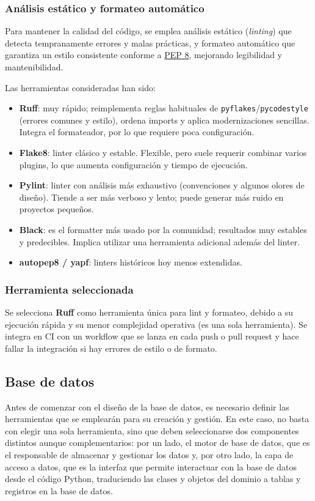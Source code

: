 \subsubsection{Análisis estático y formateo automático}
Para mantener la calidad del código, se emplea análisis estático (\emph{linting}) que detecta tempranamente 
errores y malas prácticas, y formateo automático que garantiza un estilo consistente conforme a 
\href{https://peps.python.org/pep-0008/}{PEP 8}, mejorando legibilidad y mantenibilidad.

Las herramientas consideradas han sido:

\begin{itemize}
  \item \textbf{Ruff}: muy rápido; reimplementa reglas habituales de \texttt{pyflakes}/\texttt{pycodestyle}
  (errores comunes y estilo), ordena imports y aplica modernizaciones sencillas. Integra el formateador, por
  lo que requiere poca configuración.
  \item \textbf{Flake8}: linter clásico y estable. Flexible, pero suele requerir combinar
  varios plugins, lo que aumenta configuración y tiempo de ejecución.
  \item \textbf{Pylint}: linter con análisis más exhaustivo (convenciones y algunos olores de diseño). Tiende
  a ser más verboso y lento; puede generar más ruido en proyectos pequeños.
  \item \textbf{Black}: es el formatter más usado por la comunidad; resultados muy estables y predecibles. Implica
  utilizar una herramienta adicional además del linter.
  \item \textbf{autopep8 / yapf}: linters históricos hoy menos extendidas.
\end{itemize}

\subsubsection{Herramienta seleccionada}
Se selecciona \textbf{Ruff} como herramienta única para lint y formateo, debido a su ejecución rápida y su menor 
complejidad operativa (es una sola herramienta).
Se integra en CI con un workflow que se lanza en cada push o pull request y hace fallar la integración si hay 
errores de estilo o de formato.

\subsection{Base de datos}\label{sec:base-datos}
Antes de comenzar con el diseño de la base de datos, es necesario definir las herramientas que se emplearán para 
su creación y gestión. En este caso, no basta con elegir una sola herramienta, sino que deben seleccionarse dos 
componentes distintos aunque complementarios: por un lado, el motor de base de datos, que es el responsable de 
almacenar y gestionar los datos y, por otro lado, la capa de acceso a datos, que es la interfaz que permite 
interactuar con la base de datos desde el código Python, traduciendo las clases y objetos del dominio a tablas y
registros en la base de datos.

